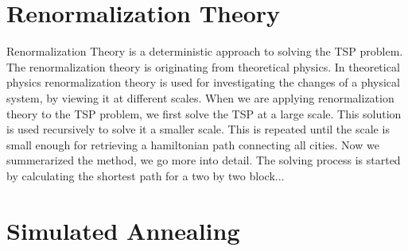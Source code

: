 \section{Renormalization Theory}
Renormalization Theory is a deterministic approach to solving the TSP problem. The renormalization theory is originating from theoretical physics. In theoretical physics renormalization theory is used for investigating the changes of a physical system, by viewing it at different scales.
\newline\newline\noindent
When we are applying renormalization theory to the TSP problem, we first solve the TSP at a large scale. This solution is used recursively to solve it a smaller scale. This is repeated until the scale is small enough for retrieving a hamiltonian path connecting all cities.
\newline\newline\noindent
Now we summerarized the method, we go more into detail. The solving process is started by calculating the shortest path for a two by two block...
\section{Simulated Annealing}



